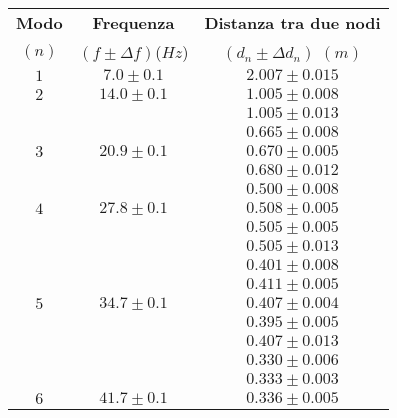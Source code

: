 \documentclass[12pt, a4paper]{article}
\begin{document}
\newpage
\begin{table}[!htb]
\centering
\begin{tabular}{|c|c|c|}
\hline
    \textbf{Modo} & \textbf{Frequenza} & \textbf{Distanza tra due nodi} \\ 
    \footnotesize$(n)$ & \footnotesize$(f\pm\Delta f)$($Hz$) & \footnotesize$(d_n\pm\Delta d_n)$ $(m)$ \\ 
    \hline\hline
    \footnotesize$1$ & \footnotesize$7.0\pm0.1$ & \footnotesize$2.007 \pm 0.015$ \\[0.7ex] 
    \hline %
    \footnotesize$2$ & \footnotesize$14.0 \pm 0.1 $ &  \footnotesize$1.005 \pm 0.008$ \\[0.7ex]
    \footnotesize & \footnotesize & \footnotesize$1.005 \pm 0.013$ \\[0.7ex]
    \hline
    \footnotesize & \footnotesize & \footnotesize$0.665 \pm 0.008$ \\ [0.7ex]
    \footnotesize$3$ & \footnotesize$20.9 \pm 0.1$ & \footnotesize$0.670 \pm 0.005$  \\ [0.7ex]
    \footnotesize & \footnotesize & \footnotesize$0.680 \pm 0.012$ \\ [0.7ex]
    \hline 
    \footnotesize & \footnotesize & \footnotesize$0.500 \pm 0.008$ \\ [0.7ex]
    \footnotesize$4$ & \footnotesize$27.8 \pm 0.1$ & \footnotesize$0.508 \pm 0.005$ \\ [0.7ex]
    \footnotesize & \footnotesize & \footnotesize$0.505 \pm 0.005$ \\ [0.7ex]
    \footnotesize & \footnotesize & \footnotesize$0.505 \pm 0.013$ \\ [0.7ex]
    \footnotesize & \footnotesize & \footnotesize$0.401 \pm 0.008$ \\ [0.7ex]
    \footnotesize & \footnotesize & \footnotesize$0.411 \pm 0.005$ \\ [0.7ex]
    \footnotesize$5$ & \footnotesize$34.7 \pm 0.1$ & \footnotesize$0.407 \pm 0.004$ \\ [0.7ex]
    \footnotesize & \footnotesize & \footnotesize$0.395 \pm 0.005$ \\ [0.7ex]
    \footnotesize & \footnotesize & \footnotesize$0.407 \pm 0.013$ \\ [0.7ex]
    \hline
    \footnotesize & \footnotesize & \footnotesize$0.330 \pm 0.006$ \\ [0.7ex]
    \footnotesize & \footnotesize & \footnotesize$0.333 \pm 0.003$ \\ [0.7ex]
    \footnotesize$6$ & \footnotesize$41.7 \pm 0.1$ & \footnotesize$0.336 \pm 0.005$ \\ [0.7ex]

\end{tabular}
\end{table}
\end{document}
